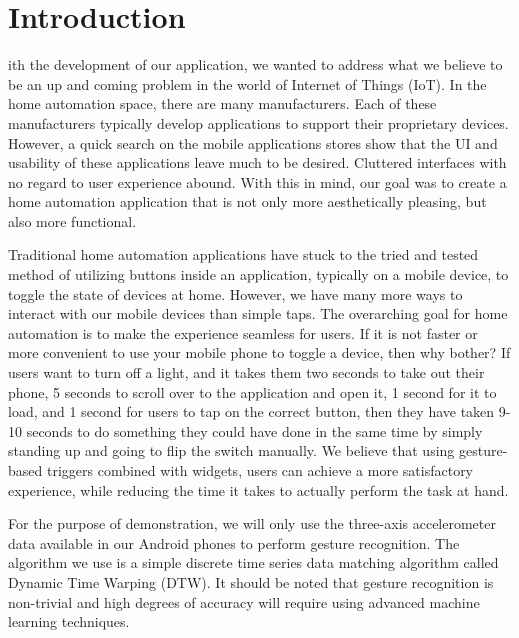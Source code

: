 \documentclass[journal]{IEEEtran}
\begin{document}
\section{Introduction}
% 
% 
% 
% 
ith the development of our application, we wanted to address what we believe to be an up and coming problem in the world of Internet of Things (IoT). In the home automation space, there are many manufacturers. Each of these manufacturers typically develop applications to support their proprietary devices. However, a quick search on the mobile applications stores show that the UI and usability of these applications leave much to be desired\cite{homeautomationapp}. Cluttered interfaces with no regard to user experience abound. With this in mind, our goal was to create a home automation application that is not only more aesthetically pleasing, but also more functional.

Traditional home automation applications have stuck to the tried and tested method of utilizing buttons inside an application, typically on a mobile device, to toggle the state of devices at home. However, we have many more ways to interact with our mobile devices than simple taps. The overarching goal for home automation is to make the experience seamless for users. If it is not faster or more convenient to use your mobile phone to toggle a device, then why bother? If users want to turn off a light, and it takes them two seconds to take out their phone, 5 seconds to scroll over to the application and open it, 1 second for it to load, and 1 second for users to tap on the correct button, then they have taken 9-10 seconds to do something they could have done in the same time by simply standing up and going to flip the switch manually. We believe that using gesture-based triggers combined with widgets, users can achieve a more satisfactory experience, while reducing the time it takes to actually perform the task at hand. 

For the purpose of demonstration, we will only use the three-axis accelerometer data available in our Android phones to perform gesture recognition. The algorithm we use is a simple discrete time series data matching algorithm called Dynamic Time Warping (DTW). It should be noted that gesture recognition is non-trivial and high degrees of accuracy will require using advanced machine learning techniques. 
\end{document}
